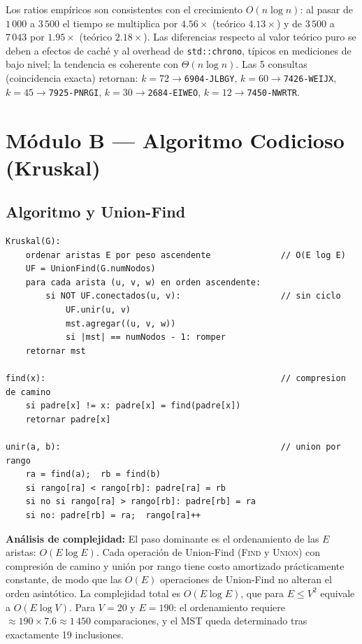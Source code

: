 \documentclass[11pt, a4paper]{article}
\begin{document}
Los ratios empíricos son consistentes con el crecimiento $O(n\log n)$: al pasar de
$1\,000$ a $3\,500$ el tiempo se multiplica por $4.56\times$ (teórico $4.13\times$) y
de $3\,500$ a $7\,043$ por $1.95\times$ (teórico $2.18\times$). Las diferencias respecto
al valor teórico puro se deben a efectos de caché y al overhead de \texttt{std::chrono},
típicos en mediciones de bajo nivel; la tendencia es coherente con $\Theta(n\log n)$.
Las 5 consultas (coincidencia exacta) retornan:
$k{=}72\to$\texttt{6904-JLBGY}, $k{=}60\to$\texttt{7426-WEIJX},
$k{=}45\to$\texttt{7925-PNRGI}, $k{=}30\to$\texttt{2684-EIWEO},
$k{=}12\to$\texttt{7450-NWRTR}.

\section{Módulo B --- Algoritmo Codicioso (Kruskal)}

\subsection{Algoritmo y Union-Find}

\begin{lstlisting}[caption=Kruskal con Union-Find por rango y compresión de camino]
Kruskal(G):
    ordenar aristas E por peso ascendente              // O(E log E)
    UF = UnionFind(G.numNodos)
    para cada arista (u, v, w) en orden ascendente:
        si NOT UF.conectados(u, v):                    // sin ciclo
            UF.unir(u, v)
            mst.agregar((u, v, w))
            si |mst| == numNodos - 1: romper
    retornar mst

find(x):                                               // compresion de camino
    si padre[x] != x: padre[x] = find(padre[x])
    retornar padre[x]

unir(a, b):                                            // union por rango
    ra = find(a);  rb = find(b)
    si rango[ra] < rango[rb]: padre[ra] = rb
    si no si rango[ra] > rango[rb]: padre[rb] = ra
    si no: padre[rb] = ra;  rango[ra]++
\end{lstlisting}

\textbf{Análisis de complejidad:} El paso dominante es el ordenamiento de las $E$
aristas: $O(E\log E)$. Cada operación de Union-Find (\textsc{Find} y \textsc{Union})
con compresión de camino y unión por rango tiene costo amortizado prácticamente
constante, de modo que las $O(E)$ operaciones de Union-Find no alteran el orden
asintótico. La complejidad total es $O(E\log E)$, que para $E\leq V^2$ equivale a
$O(E\log V)$. Para $V=20$ y $E=190$: el ordenamiento requiere $\approx190\times7.6\approx
1\,450$ comparaciones, y el MST queda determinado tras exactamente 19 inclusiones.
\end{document}
